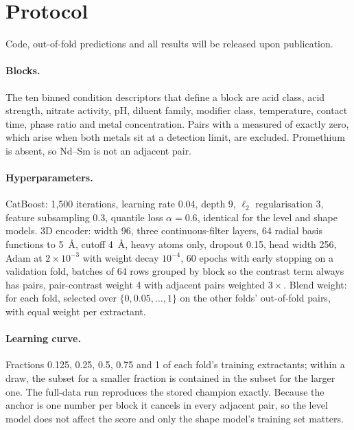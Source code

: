 \appendix
\section{Protocol}
\label{app:protocol}
Code, out-of-fold predictions and all results will be released upon publication.
\paragraph{Blocks.} The ten binned condition descriptors that define a block are acid class, acid strength, nitrate activity, pH, diluent family, modifier class, temperature, contact time, phase ratio and metal concentration. Pairs with a measured \logSF{} of exactly zero, which arise when both metals sit at a detection limit, are excluded. Promethium is absent, so Nd--Sm is not an adjacent pair.
\paragraph{Hyperparameters.} CatBoost: 1{,}500 iterations, learning rate 0.04, depth 9, $\ell_2$ regularisation 3, feature subsampling 0.3, quantile loss $\alpha = 0.6$, identical for the level and shape models. 3D encoder: width 96, three continuous-filter layers, 64 radial basis functions to 5~\AA{}, cutoff 4~\AA{}, heavy atoms only, dropout 0.15, head width 256, Adam at $2 \times 10^{-3}$ with weight decay $10^{-4}$, 60 epochs with early stopping on a validation fold, batches of 64 rows grouped by block so the contrast term always has pairs, pair-contrast weight 4 with adjacent pairs weighted $3\times$. Blend weight: for each fold, selected over $\{0, 0.05, \dots, 1\}$ on the other folds' out-of-fold pairs, with equal weight per extractant.
\paragraph{Learning curve.} Fractions 0.125, 0.25, 0.5, 0.75 and 1 of each fold's training extractants; within a draw, the subset for a smaller fraction is contained in the subset for the larger one. The full-data run reproduces the stored champion exactly. Because the anchor is one number per block it cancels in every adjacent pair, so the level model does not affect the score and only the shape model's training set matters.

